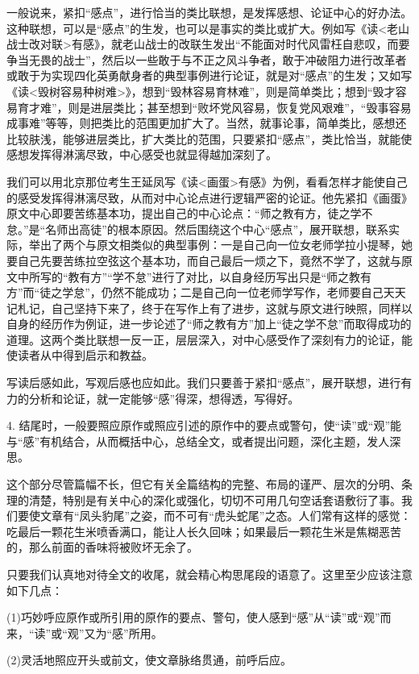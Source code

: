一般说来，紧扣“感点”，进行恰当的类比联想，是发挥感想、论证中心的好办法。这种联想，可以是“感点”的生发，也可以是事实的类比或扩大。例如写《读<老山战士改对联>有感》，就老山战士的改联生发出“不能面对时代风雷枉自悲叹，而要争当无畏的战士”，然后以一些敢于与不正之风斗争者，敢于冲破阻力进行改革者或敢于为实现四化英勇献身者的典型事例进行论证，就是对“感点”的生发；又如写《读<毁树容易种树难>》，想到“毁林容易育林难”，则是简单类比；想到“毁才容易育才难”，则是进层类比；甚至想到“败坏党风容易，恢复党风艰难”，“毁事容易成事难”等等，则把类比的范围更加扩大了。当然，就事论事，简单类比，感想还比较肤浅，能够进层类比，扩大类比的范围，只要紧扣“感点”，类比恰当，就能使感想发挥得淋漓尽致，中心感受也就显得越加深刻了。

我们可以用北京那位考生王延凤写《读<画蛋>有感》为例，看看怎样才能使自己的感受发挥得淋漓尽致，从而对中心论点进行逻辑严密的论证。他先紧扣《画蛋》原文中心即要苦练基本功，提出自己的中心论点：“师之教有方，徒之学不怠。”是“名师出高徒”的根本原因。然后围绕这个中心“感点”，展开联想，联系实际，举出了两个与原文相类似的典型事例：一是自己向一位女老师学拉小提琴，她要自己先要苦练拉空弦这个基本功，而自己最后一烦之下，竟然不学了，这就与原文中所写的“教有方”“学不怠”进行了对比，以自身经历写出只是“师之教有方”而“徒之学怠”，仍然不能成功；二是自己向一位老师学写作，老师要自己天天记札记，自己坚持下来了，终于在写作上有了进步，这就与原文进行映照，同样以自身的经历作为例证，进一步论述了“师之教有方”加上“徒之学不怠”而取得成功的道理。这两个类比联想一反一正，层层深入，对中心感受作了深刻有力的论证，能使读者从中得到启示和教益。

写读后感如此，写观后感也应如此。我们只要善于紧扣“感点”，展开联想，进行有力的分析和论证，就一定能够“感”得深，想得透，写得好。

4. 结尾时，一般要照应原作或照应引述的原作中的要点或警句，使“读”或“观”能与“感”有机结合，从而概括中心，总结全文，或者提出问题，深化主题，发人深思。

这个部分尽管篇幅不长，但它有关全篇结构的完整、布局的谨严、层次的分明、条理的清楚，特别是有关中心的深化或强化，切切不可用几句空话套语敷衍了事。我们要使文章有“凤头豹尾”之姿，而不可有“虎头蛇尾”之态。人们常有这样的感觉：吃最后一颗花生米喷香满口，能让人长久回味；如果最后一颗花生米是焦糊恶苦的，那么前面的香味将被败坏无余了。

只要我们认真地对待全文的收尾，就会精心构思尾段的语意了。这里至少应该注意如下几点：

(1)巧妙呼应原作或所引用的原作的要点、警句，使人感到“感”从“读”或“观”而来，“读”或“观”又为“感”所用。

(2)灵活地照应开头或前文，使文章脉络贯通，前呼后应。

